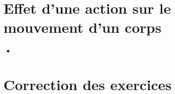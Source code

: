 \documentclass[12pt,a4paper]{article}
\date{}
\title{}
\begin{document}
	
	

\section{Effet d'une action sur le mouvement d'un corps}








\begin{myexos}
	\begin{itemize}
		\item 
	\end{itemize}
\end{myexos}

\appendix

\newpage

\section*{Correction des exercices}
\end{document}

